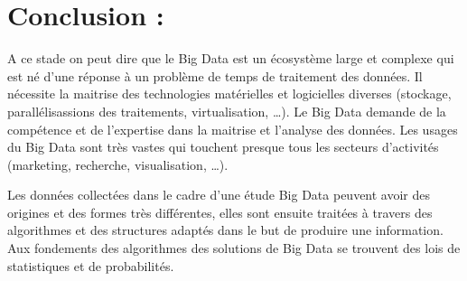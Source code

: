 \section*{Conclusion : }
A ce stade on peut dire que le Big Data est un écosystème large et complexe qui est né d’une réponse à un problème de temps de traitement des données.  Il nécessite la maitrise des  technologies matérielles et logicielles diverses (stockage, parallélisassions des  traitements, virtualisation,  …).  Le Big Data demande de la compétence et de l’expertise dans la maitrise et l’analyse des données. Les usages du Big Data sont très vastes qui touchent presque tous les secteurs d’activités (marketing, recherche, visualisation, …).
   
Les données collectées dans le cadre d’une étude Big Data peuvent avoir des origines et des formes très différentes, elles sont ensuite traitées à travers des algorithmes et des structures adaptés dans le but de produire une information. Aux fondements des algorithmes des solutions de Big Data se trouvent des lois de statistiques et de probabilités.
